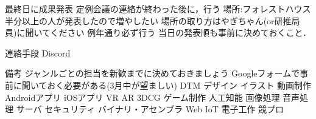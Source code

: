         最終日に成果発表
            定例会議の連絡が終わった後に，行う
            場所:フォレストハウス
                半分以上の人が発表したので増やしたい
                場所の取り方はやぎちゃん(or研推局員)に聞いてください
            例年通り必ず行う
            当日の発表順も事前に決めておくこと．
             
        連絡手段
            Discord

 備考
    ジャンルごとの担当を新歓までに決めておきましょう
    Googleフォームで事前に聞いておく必要がある(3月中が望ましい)
        DTM
        デザイン
        イラスト
        動画制作
        Androidアプリ
        iOSアプリ
        VR
        AR
        3DCG
        ゲーム制作
        人工知能
        画像処理
        音声処理
        サーバ
        セキュリティ
        バイナリ・アセンブラ
        Web
        IoT
        電子工作
        競プロ


        
                    
                
        

    

    

